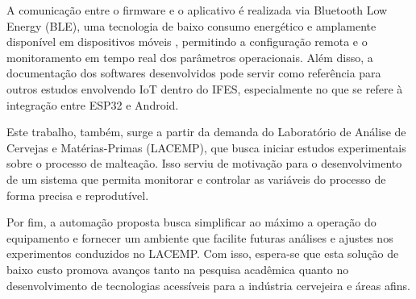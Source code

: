 A comunicação entre o firmware e o aplicativo é realizada via Bluetooth Low Energy (BLE), uma tecnologia de baixo consumo energético e amplamente disponível em dispositivos móveis \cite{heydon2012bluetooth}, permitindo a configuração remota e o monitoramento em tempo real dos parâmetros operacionais. Além disso, a documentação dos softwares desenvolvidos pode servir como referência para outros estudos envolvendo IoT dentro do IFES, especialmente no que se refere à integração entre ESP32 e Android.

Este trabalho, também, surge a partir da demanda do Laboratório de Análise de Cervejas e Matérias-Primas (LACEMP), que busca iniciar estudos experimentais sobre o processo de malteação. Isso serviu de motivação para o desenvolvimento de um sistema que permita monitorar e controlar as variáveis do processo de forma precisa e reprodutível. 

Por fim, a automação proposta busca simplificar ao máximo a operação do equipamento e fornecer um ambiente que facilite futuras análises e ajustes nos experimentos conduzidos no LACEMP. Com isso, espera-se que esta solução de baixo custo promova avanços tanto na pesquisa acadêmica quanto no desenvolvimento de tecnologias acessíveis para a indústria cervejeira e áreas afins.